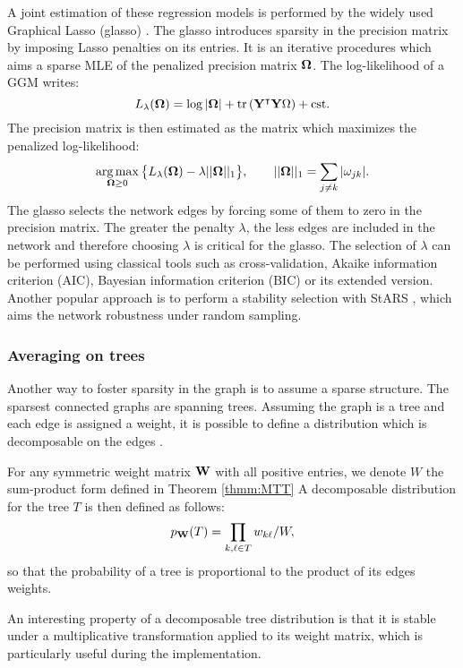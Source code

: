  A joint estimation of these regression models is performed by the widely used Graphical Lasso (glasso) \citep{glasso}. The glasso introduces sparsity in the precision matrix by imposing Lasso penalties on its entries. It is an iterative procedures which aims a sparse MLE of the penalized precision matrix ${\boldsymbol{\Omega}}$.  The log-likelihood of a GGM writes:
 $$L_\lambda({\boldsymbol{\Omega}}) = \log |{\boldsymbol{\Omega}}| +\rm tr\left( {\bf Y}^\intercal {\bf Y} {\boldsymbol{\Omega}} \right)+cst .$$
 The precision matrix is then estimated as the matrix which maximizes the penalized log-likelihood:
 $$\operatorname*{arg\,max}_{{\boldsymbol{\Omega}}\geq 0} \big\{L_\lambda({\boldsymbol{\Omega}}) - \lambda ||{\boldsymbol{\Omega}}||_1\big\}, \qquad ||{\boldsymbol{\Omega}}||_1 = \sum_{j\neq k} |\omega_{jk}|.$$
The glasso  selects the network edges by forcing some of them to zero in the precision matrix. The greater the penalty $\lambda$, the less edges are included in the network and therefore choosing $\lambda$ is critical for the glasso. The selection of $\lambda$ can be performed using classical tools such as cross-validation, Akaike information criterion (AIC),  Bayesian information criterion (BIC) or its extended version.  Another popular approach is to perform a stability selection with StARS \citep{stars}, which aims the network robustness under random sampling.


 
 \subsubsection{Averaging on trees}\label{tree:aver}
 
  Another way to foster sparsity in the graph is to assume a sparse structure. The sparsest connected graphs are spanning trees. Assuming the graph is a tree and each edge is assigned a weight, it is possible to define a distribution which is decomposable on the edges \citep{MixtTrees,MeilaJaak}.
\begin{definition} 
For any symmetric weight matrix ${\bf W}$ with all positive entries, we denote $W$ the sum-product form defined in Theorem \ref{thmm:MTT} A decomposable  distribution for the tree $T$ is then defined as follows:
$$p_{{\bf W}}(T) = \prod_{k,\ell \in T} w_{k\ell} / W ,$$
so that the probability of a tree is proportional to the product of its edges weights.
\end{definition}

An interesting property of a decomposable tree distribution is that it is stable under a multiplicative transformation applied to its weight matrix, which is particularly useful during the implementation.\\

